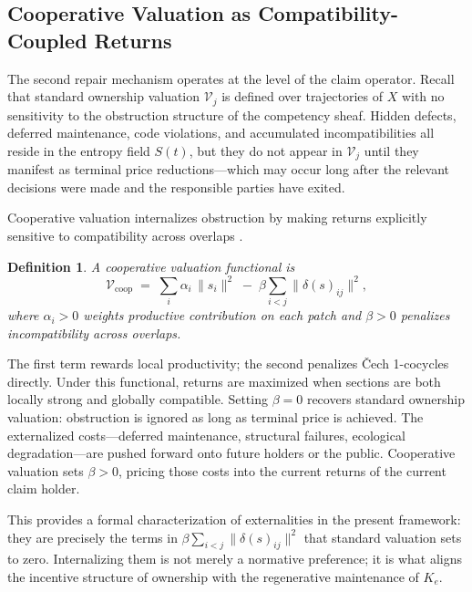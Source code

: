 \documentclass[12pt]{article}
\newtheorem{definition}{Definition}
\begin{document}
\subsection{Cooperative Valuation as Compatibility-Coupled Returns}

The second repair mechanism operates at the level of the claim operator. Recall that standard ownership valuation $\mathcal{V}_j$ is defined over trajectories of $X$ with no sensitivity to the obstruction structure of the competency sheaf. Hidden defects, deferred maintenance, code violations, and accumulated incompatibilities all reside in the entropy field $S(t)$, but they do not appear in $\mathcal{V}_j$ until they manifest as terminal price reductions---which may occur long after the relevant decisions were made and the responsible parties have exited.

Cooperative valuation internalizes obstruction by making returns explicitly sensitive to compatibility across overlaps \cite{Ostrom1990,Coase1937}.

\begin{definition}
A \emph{cooperative valuation functional} is
\begin{equation}
\mathcal{V}_{\mathrm{coop}} \;=\; \sum_i \alpha_i \,\|s_i\|^2 \;-\; \beta \sum_{i < j} \bigl\|\delta(s)_{ij}\bigr\|^2,
\end{equation}
where $\alpha_i > 0$ weights productive contribution on each patch and $\beta > 0$ penalizes incompatibility across overlaps.
\end{definition}

The first term rewards local productivity; the second penalizes Čech 1-cocycles directly. Under this functional, returns are maximized when sections are both locally strong and globally compatible. Setting $\beta = 0$ recovers standard ownership valuation: obstruction is ignored as long as terminal price is achieved. The externalized costs---deferred maintenance, structural failures, ecological degradation---are pushed forward onto future holders or the public. Cooperative valuation sets $\beta > 0$, pricing those costs into the current returns of the current claim holder.

This provides a formal characterization of externalities in the present framework: they are precisely the terms in $\beta\sum_{i<j}\|\delta(s)_{ij}\|^2$ that standard valuation sets to zero. Internalizing them is not merely a normative preference; it is what aligns the incentive structure of ownership with the regenerative maintenance of $K_e$.
\end{document}
